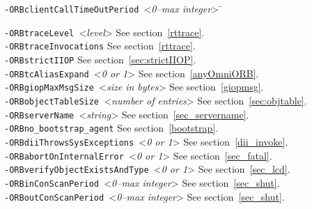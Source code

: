 \documentclass[11pt,twoside,a4paper]{book}
\newcommand{\cmdline}[1]{\texttt{#1}}
\begin{document}
\begin{tabbing}
\cmdline{-ORBclientCallTimeOutPeriod }<\textit{0--max integer}> \=\kill

\cmdline{-ORBtraceLevel }<\textit{level}>\> See section~\ref{rttrace}.\\

\cmdline{-ORBtraceInvocations}           \> See section~\ref{rttrace}.\\

\cmdline{-ORBstrictIIOP}                 \> See section~\ref{sec:strictIIOP}.\\

\cmdline{-ORBtcAliasExpand }<\textit{0 or 1}>
                                         \> See section~\ref{anyOmniORB}.\\

\cmdline{-ORBgiopMaxMsgSize }<\textit{size in bytes}>
                                         \> See section~\ref{giopmsg}.\\

\cmdline{-ORBobjectTableSize }<\textit{number of entries}>
                                         \> See section~\ref{sec:objtable}.\\

\cmdline{-ORBserverName }<\textit{string}>
                                         \> See section~\ref{sec_servername}.\\

\cmdline{-ORBno\_bootstrap\_agent}       \> See section~\ref{bootstrap}.\\

\cmdline{-ORBdiiThrowsSysExceptions }<\textit{0 or 1}>
                                         \> See section~\ref{dii_invoke}.\\

\cmdline{-ORBabortOnInternalError }<\textit{0 or 1}>
                                         \> See section~\ref{sec_fatal}.\\

\cmdline{-ORBverifyObjectExistsAndType }<\textit{0 or 1}>
                                         \> See section~\ref{sec_lcd}.\\

\cmdline{-ORBinConScanPeriod }<\textit{0--max integer}>
                                         \> See section~\ref{sec_shut}.\\

\cmdline{-ORBoutConScanPeriod }<\textit{0--max integer}>
                                         \> See section~\ref{sec_shut}.\\


\end{tabbing}
\end{document}
